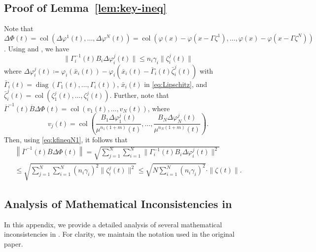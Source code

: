 \documentclass[journal]{IEEEtran}
\newcommand{\diag}{\operatorname{diag}}	%
\newcommand{\col}{\operatorname{col}}
\begin{document}




\appendix

\subsection{Proof of Lemma~\ref{lem:key-ineq}}
\label{append:tech-lemmas}
    
Note that $\Delta \Phi(t) = \col(\Delta \varphi^{1}(t),\ldots,\Delta \varphi^{N}(t)) =\col(\varphi(x)-\varphi(x-\Gamma\zeta^{1}),\ldots,\varphi(x)-\varphi(x-\Gamma\zeta^{N}))$.
Using \cite[Lemma 1]{Alessandri2013} and \cite[Eq. (23)]{Zemouche2019}, we have
\begin{equation}\label{eq:kfineqN1}
    \| \Gamma^{-1}_i(t) B_i \Delta \varphi^j_i(t)\| \leq n_i\gamma_i \|\zeta^j_i(t)\|
\end{equation}
where 
$\Delta\varphi^j_i(t) \coloneqq \varphi_i(\bar x_i(t)) - \varphi_i(\bar x_i(t) - \bar\Gamma_i(t) \bar\zeta^j_i(t))$
with $\bar\Gamma_i(t) = \diag(\Gamma_1(t),\dots,\Gamma_i(t))$, $\bar x_i(t)$ in \eqref{eq:Lipschitz}, and $\bar\zeta^j_i(t) = \col(\zeta^j_1(t),\dots,\zeta^j_i(t))$.
Further, note that $\overline{\Gamma}^{-1}(t) \overline B \Delta\Phi(t) =\col(v_1(t),\dots,v_N(t))$,
where
\[
v_j(t) = \col\left(\frac{B_1\Delta \varphi^{j}_1(t)}{\mu^{n_1(1+m)}(t)}, \dots, \frac{B_N\Delta \varphi^{j}_N(t)}{\mu^{n_N(1+m)}(t)}\right).
\]
Then, using \eqref{eq:kfineqN1}, it follows that
\begin{multline*}
    \left\|\overline{\Gamma}^{-1}(t)\overline{B}\Delta\Phi(t)\right\| = 
    \sqrt{\sum_{j=1}^N \sum_{i=1}^N \|\Gamma_i^{-1}(t)B_i\Delta\varphi_i^j(t)\|^2} \\
    \leq \sqrt{\sum_{j=1}^N \sum_{i=1}^N (n_i\gamma_i)^2 \|\zeta_i^j(t)\|^2}
    \leq \sqrt{N \sum_{i=1}^N  (n_i\gamma_i)^2}\cdot\|\zeta(t) \|.
\end{multline*}


\subsection{Analysis of Mathematical Inconsistencies in \cite{Adil2024}}
\label{append:mistakes-adil2024}

In this appendix, we provide a detailed analysis of several mathematical inconsistencies in \cite[Theorem 1 and 2]{Adil2024}. For clarity, we maintain the notation used in the original paper.
\end{document}
